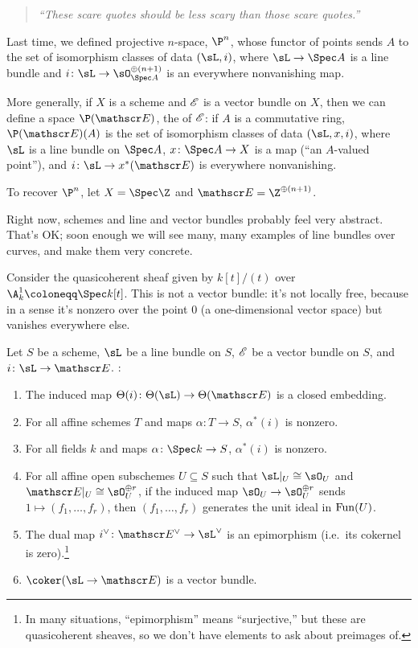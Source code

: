 \begin{quote}\textit{
	``These scare quotes should be less scary than those scare quotes.''
}\end{quote}
Last time, we defined projective $n$-space, $\P^n$, whose functor of points sends $A$ to the set of isomorphism
classes of data $(\sL,i)$, where $\sL\to\Spec A$ is a line bundle and $i\colon\sL\to\sO_{\Spec A}^{\oplus(n+1)}$ is
an everywhere nonvanishing map.
\begin{defn}
More generally, if $X$ is a scheme and $\mathscr E$ is a vector bundle on $X$, then we can define a space $\P(\sE)$, the
 of $\mathscr E$: if $A$ is a commutative ring, $\P(\sE)(A)$ is the set of isomorphism classes of
data $(\sL,x, i)$, where $\sL$ is a line bundle on $\Spec A$, $x\colon\Spec A\to X$ is a map (``an $A$-valued
point''), and $i\colon\sL\to x^*(\sE)$ is everywhere nonvanishing.
\end{defn}
To recover $\P^n$, let $X = \Spec\Z$ and $\sE = \Z^{\oplus(n+1)}$.
\begin{rem}
Right now, schemes and line and vector bundles probably feel very abstract. That's OK; soon enough we will see
many, many examples of line bundles over curves, and make them very concrete.
\end{rem}
\begin{exm}
Consider the quasicoherent sheaf given by $k[t]/(t)$ over $\A_k^1\coloneqq\Spec k[t]$. This is not a vector bundle:
it's not locally free, because in a sense it's nonzero over the point $0$ (a one-dimensional vector space) but
vanishes everywhere else.
\end{exm}
\begin{prop}
\label{totsp}
Let $S$ be a scheme, $\sL$ be a line bundle on $S$, $\mathscr E$ be a vector bundle on $S$, and $i\colon\sL\to\sE$. \TFAE:
\begin{enumerate}
	\item\label{thetaclosed} The induced map $\Theta(i)\colon\Theta(\sL)\to\Theta(\sE)$ is a closed embedding.
	\item\label{Talpha} For all affine schemes $T$ and maps $\alpha\colon T\to S$, $\alpha^*(i)$ is nonzero.
	\item\label{ptalpha} For all fields $k$ and maps $\alpha\colon\Spec k\to S$, $\alpha^*(i)$ is nonzero.
	\item\label{genuniti} For all affine open subschemes $U\subseteq S$ such that $\sL|_U\cong\sO_U$ and
	$\sE|_U\cong\sO_U^{\oplus r}$, if the induced map $\sO_U\to\sO_U^{\oplus r}$ sends $1\mapsto (f_1,\dotsc,f_r)$,
	then $(f_1,\dotsc,f_r)$ generates the unit ideal in $\mathrm{Fun}(U)$.
	\item\label{cokerepi} The dual map $i^\vee\colon\sE^\vee\to\sL^\vee$ is an epimorphism (i.e.\ its cokernel is
	zero).\footnote{In many situations, ``epimorphism'' means ``surjective,'' but these are quasicoherent sheaves,
	so we don't have elements to ask about preimages of.}
	\item\label{cokervb} $\coker(\sL\to\sE)$ is a vector bundle.
\end{enumerate}
\end{prop}
